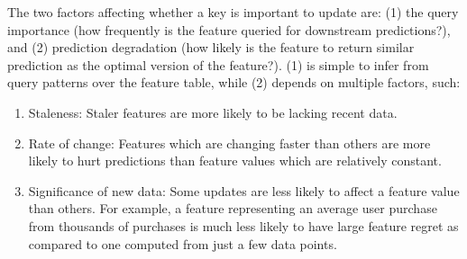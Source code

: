 The two factors affecting whether a key is important to update are: (1) the query importance (how frequently is the feature queried for downstream predictions?), and (2) prediction degradation (how likely is the feature to return similar prediction as the optimal version of the feature?). (1) is simple to infer from query patterns over the feature table, while (2) depends on multiple factors, such: 
\begin{enumerate}
    \item Staleness: Staler features are more likely to be lacking recent data. 
    \item Rate of change: Features which are changing faster than others are more likely to hurt predictions than feature values which are relatively constant. 
    \item Significance of new data: Some updates are less likely to affect a feature value than others. For example, a feature representing an average user purchase from thousands of purchases is much less likely to have large feature regret as compared to one computed from just a few data points.
\end{enumerate}






